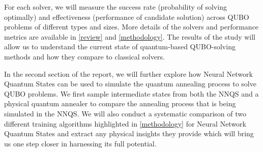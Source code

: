 

For each solver, we will measure the success rate (probability of solving optimally) and effectiveness (performance of candidate solution) across QUBO problems of different types and sizes. More details of the solvers and performance metrics are available in \autoref{review} and \autoref{methodology}. The results of the study will allow us to understand the current state of quantum-based QUBO-solving methods and how they compare to classical solvers. 

In the second section of the report, we will further explore how Neural Network Quantum States can be used to simulate the quantum annealing process to solve QUBO problems. We first sample intermediate states from both the NNQS and a physical quantum annealer to compare the annealing process that is being simulated in the NNQS. We will also conduct a systematic comparison of two different training algorithms highlighted in \autoref{methodology} for Neural Network Quantum States and extract any physical insights they provide which will bring us one step closer in harnessing its full potential.
